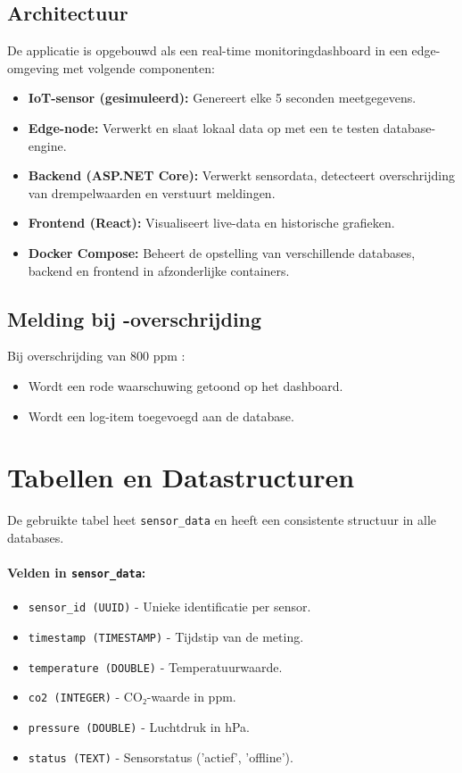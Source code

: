 \subsection{Architectuur}

De applicatie is opgebouwd als een real-time monitoringdashboard in een edge-omgeving met volgende componenten:

\begin{itemize}
    \item \textbf{IoT-sensor (gesimuleerd):} Genereert elke 5 seconden meetgegevens.
    \item \textbf{Edge-node:} Verwerkt en slaat lokaal data op met een te testen database-engine.
    \item \textbf{Backend (ASP.NET Core):} Verwerkt sensordata, detecteert overschrijding van drempelwaarden en verstuurt meldingen.
    \item \textbf{Frontend (React):} Visualiseert live-data en historische grafieken.
    \item \textbf{Docker Compose:} Beheert de opstelling van verschillende databases, backend en frontend in afzonderlijke containers.
\end{itemize}

\subsection{Melding bij -overschrijding}

Bij overschrijding van 800 ppm :
\begin{itemize}
    \item Wordt een rode waarschuwing getoond op het dashboard.
    \item Wordt een log-item toegevoegd aan de database.
\end{itemize}

\section{Tabellen en Datastructuren}

De gebruikte tabel heet \texttt{sensor\_data} en heeft een consistente structuur in alle databases.

\paragraph{Velden in \texttt{sensor\_data}:}
\begin{itemize}
    \item \texttt{sensor\_id (UUID)} - Unieke identificatie per sensor.
    \item \texttt{timestamp (TIMESTAMP)} - Tijdstip van de meting.
    \item \texttt{temperature (DOUBLE)} - Temperatuurwaarde.
    \item \texttt{co2 (INTEGER)} - CO₂-waarde in ppm.
    \item \texttt{pressure (DOUBLE)} - Luchtdruk in hPa.
    \item \texttt{status (TEXT)} - Sensorstatus ('actief', 'offline').
\end{itemize}

